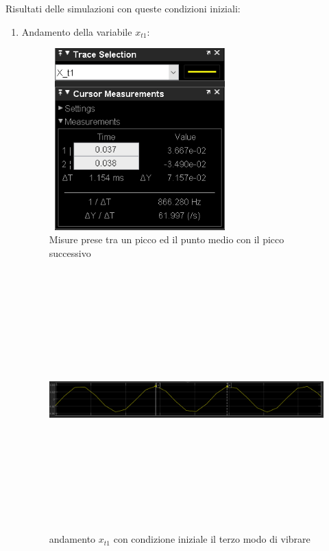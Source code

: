 \documentclass{article}
\begin{document}
Risultati delle simulazioni con queste condizioni iniziali: 
\begin{enumerate}

    \item 
   Andamento della variabile $x_{t1}$:
       
        \begin{figure}[H]
        \centering
        \includegraphics[width=7cm,height=7cm,keepaspectratio]{./simulink/assex/modo3_t1tab.png}
        \caption{Misure prese tra un picco ed il punto medio con il picco successivo}
        \end{figure}
        
        \begin{figure}[H]
        \centering
        \includegraphics[width=12cm,height=10cm,keepaspectratio]{./simulink/assex/modo3_t1.png}
        \caption{andamento $x_{t1}$ con condizione iniziale il terzo modo di vibrare}
        \end{figure}


\end{enumerate}
\end{document}
